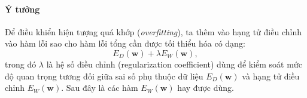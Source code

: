 \paragraph{Ý tưởng}
Để điều khiển hiện tượng quá khớp (\textit{overfitting}), ta thêm vào hạng tử
điều chỉnh vào hàm lỗi sao cho hàm lỗi tổng cần được tối thiểu hóa có dạng:
\begin{equation}
  E_D(\boldsymbol{w}) + \lambda E_W(\boldsymbol{w}),
\end{equation}
trong đó $\lambda$ là hệ số điều chỉnh (regularization coefficient) dùng để
kiểm soát
mức độ quan trọng tương đối giữa sai số phụ thuộc dữ liệu
$E_D(\boldsymbol{w})$ và hạng tử điều chỉnh $E_W(\boldsymbol{w})$. Sau đây là
các hàm $E_W(\boldsymbol{w})$ hay được dùng.
